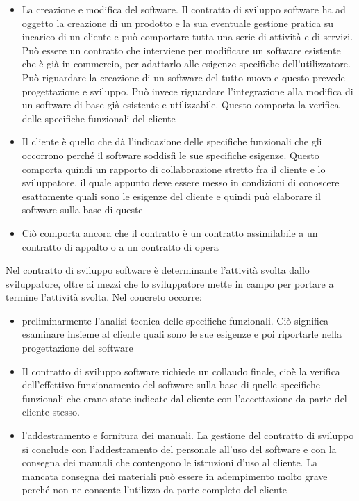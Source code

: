 \begin{itemize}
    \item La creazione e modifica del software. Il contratto di sviluppo software ha ad oggetto la creazione di un prodotto e la sua eventuale gestione pratica su incarico di un cliente e può comportare tutta una serie di attività e di servizi. Può essere un contratto che interviene per modificare un software esistente che è già in commercio, per adattarlo alle esigenze specifiche dell'utilizzatore. Può riguardare la creazione di un software del tutto nuovo e questo prevede progettazione e sviluppo. Può invece riguardare l'integrazione alla modifica di un software di base già esistente e utilizzabile. Questo comporta la verifica delle specifiche funzionali del cliente
    \item Il cliente è quello che dà l'indicazione delle specifiche funzionali che gli occorrono perché il software soddisfi le sue specifiche esigenze. Questo comporta quindi un rapporto di collaborazione stretto fra il cliente e lo sviluppatore, il quale appunto deve essere messo in condizioni di conoscere esattamente quali sono le esigenze del cliente e quindi può elaborare il software sulla base di queste
    \item Ciò comporta ancora che il contratto è un contratto assimilabile a un contratto di appalto o a un contratto di opera
\end{itemize}

Nel contratto di sviluppo software è determinante l'attività svolta dallo sviluppatore, oltre ai mezzi che lo sviluppatore mette in campo per portare a termine l'attività svolta. 
Nel concreto occorre:

\begin{itemize}
    \item preliminarmente l'analisi tecnica delle specifiche funzionali. Ciò significa esaminare insieme al cliente quali sono le sue esigenze e poi riportarle nella progettazione del software 
    \item Il contratto di sviluppo software richiede un collaudo finale, cioè la verifica dell'effettivo funzionamento del software sulla base di quelle specifiche funzionali che erano state indicate dal cliente con l'accettazione da parte del cliente stesso.
    \item l'addestramento e fornitura dei manuali. La gestione del contratto di sviluppo si conclude con l'addestramento del personale all'uso del software e con la consegna dei manuali che contengono le istruzioni d'uso al cliente. La mancata consegna dei materiali può essere in adempimento molto grave perché non ne consente l'utilizzo da parte completo del cliente
\end{itemize}

